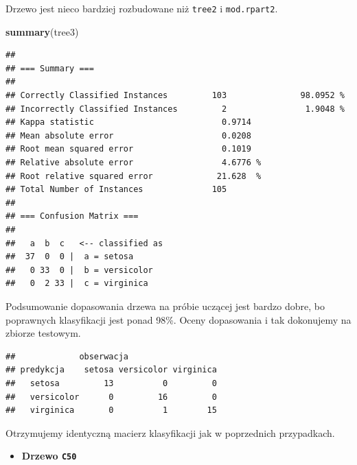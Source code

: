 \documentclass[]{book}
\newenvironment{Shaded}{\begin{snugshade}}{\end{snugshade}}
\newcommand{\DataTypeTok}[1]{\textcolor[rgb]{0.13,0.29,0.53}{#1}}
\newcommand{\KeywordTok}[1]{\textcolor[rgb]{0.13,0.29,0.53}{\textbf{#1}}}
\newcommand{\NormalTok}[1]{#1}
\newcommand{\OperatorTok}[1]{\textcolor[rgb]{0.81,0.36,0.00}{\textbf{#1}}}
\newcommand{\StringTok}[1]{\textcolor[rgb]{0.31,0.60,0.02}{#1}}
\providecommand{\tightlist}{%
  \setlength{\itemsep}{0pt}\setlength{\parskip}{0pt}}
\theoremstyle{plain}
\theoremstyle{definition}
\theoremstyle{definition}
\theoremstyle{definition}
\theoremstyle{definition}
\theoremstyle{remark}
\begin{document}
Drzewo jest nieco bardziej rozbudowane niż \texttt{tree2} i \texttt{mod.rpart2}.

\begin{Shaded}
\begin{Highlighting}[]
\KeywordTok{summary}\NormalTok{(tree3)}
\end{Highlighting}
\end{Shaded}

\begin{verbatim}
## 
## === Summary ===
## 
## Correctly Classified Instances         103               98.0952 %
## Incorrectly Classified Instances         2                1.9048 %
## Kappa statistic                          0.9714
## Mean absolute error                      0.0208
## Root mean squared error                  0.1019
## Relative absolute error                  4.6776 %
## Root relative squared error             21.628  %
## Total Number of Instances              105     
## 
## === Confusion Matrix ===
## 
##   a  b  c   <-- classified as
##  37  0  0 |  a = setosa
##   0 33  0 |  b = versicolor
##   0  2 33 |  c = virginica
\end{verbatim}

Podsumowanie dopasowania drzewa na próbie uczącej jest bardzo dobre, bo poprawnych klasyfikacji jest ponad 98\%. Oceny dopasowania i tak dokonujemy na zbiorze testowym.

\begin{Shaded}
\end{Shaded}

\begin{verbatim}
##             obserwacja
## predykcja    setosa versicolor virginica
##   setosa         13          0         0
##   versicolor      0         16         0
##   virginica       0          1        15
\end{verbatim}

Otrzymujemy identyczną macierz klasyfikacji jak w poprzednich przypadkach.

\begin{itemize}
\tightlist
\item
  \textbf{Drzewo \texttt{C50}}
\end{itemize}
\end{document}
